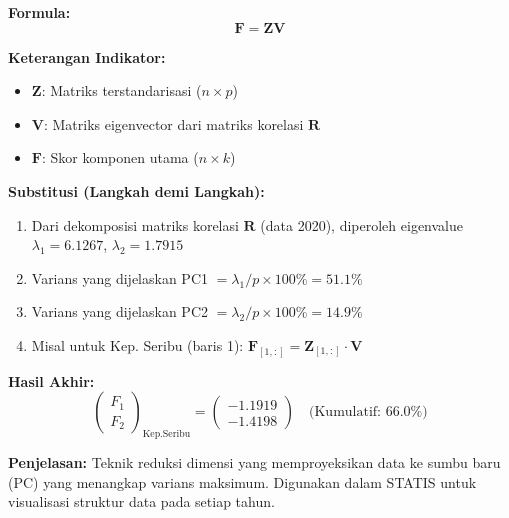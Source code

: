 \documentclass[11pt,a4paper]{article}
\begin{document}
\begin{tcolorbox}[formula_box, title={PCA ($\mathbf{F}=\mathbf{Z}\mathbf{V}$)}]
\textbf{Formula:}
\[ \mathbf{F} = \mathbf{Z}\mathbf{V} \]

\textbf{Keterangan Indikator:}
\begin{itemize}
  \item $\mathbf{Z}$: Matriks terstandarisasi ($n\times p$)
  \item $\mathbf{V}$: Matriks eigenvector dari matriks korelasi $\mathbf{R}$
  \item $\mathbf{F}$: Skor komponen utama ($n\times k$)
\end{itemize}

\textbf{Substitusi (Langkah demi Langkah):}
\begin{enumerate}
  \item Dari dekomposisi matriks korelasi $\mathbf{R}$ (data 2020), diperoleh eigenvalue $\lambda_1=6.1267$, $\lambda_2=1.7915$
  \item Varians yang dijelaskan PC1 $= \lambda_1 / p \times 100\% = 51.1\%$
  \item Varians yang dijelaskan PC2 $= \lambda_2 / p \times 100\% = 14.9\%$
  \item Misal untuk Kep. Seribu (baris 1): $\mathbf{F}_{[1,:]} = \mathbf{Z}_{[1,:]} \cdot \mathbf{V}$
\end{enumerate}

\textbf{Hasil Akhir:}
\[ \begin{pmatrix} F_1 \\ F_2 \end{pmatrix}_{\text{Kep.Seribu}} = \begin{pmatrix} -1.1919 \\ -1.4198 \end{pmatrix} \quad \text{(Kumulatif: 66.0\%)} \]

\textbf{Penjelasan:} Teknik reduksi dimensi yang memproyeksikan data ke sumbu baru (PC) yang menangkap varians maksimum. Digunakan dalam STATIS untuk visualisasi struktur data pada setiap tahun.
\end{tcolorbox}
\end{document}
